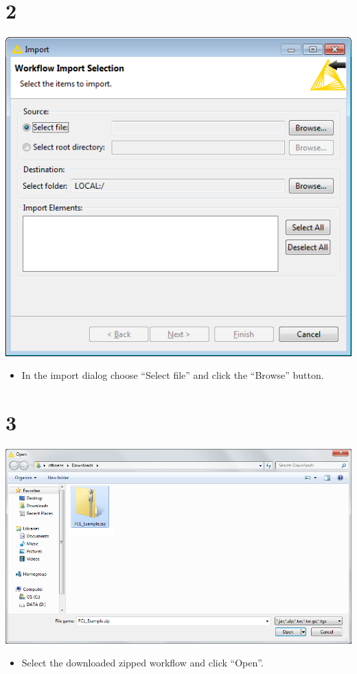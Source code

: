 \documentclass[10pt]{beamer}
\begin{document}
\section{2}
\begin{frame}
	\begin{center}
  		\includegraphics[height=0.6\textheight]{2.png}
	\end{center}
	\begin{itemize}
		\item In the import dialog choose ``Select file'' and click the ``Browse'' button.
	\end{itemize}
\end{frame}

\section{3}
\begin{frame}
	\begin{center}
  		\includegraphics[height=0.6\textheight]{3.png}
	\end{center}
	\begin{itemize}
		\item Select the downloaded zipped workflow and click ``Open''.
	\end{itemize}
\end{frame}
\end{document}
